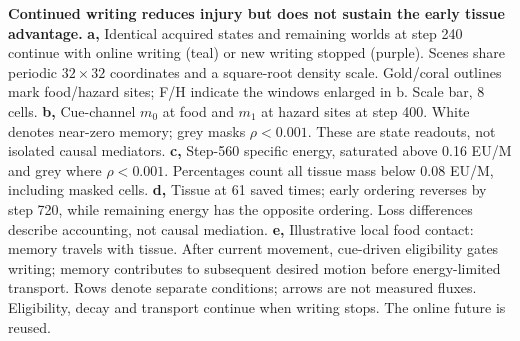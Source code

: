 \textbf{Continued writing reduces injury but does not sustain the early tissue advantage.}
\textbf{a,} Identical acquired states and remaining worlds at step 240 continue with online writing (teal) or new writing stopped (purple). Scenes share periodic $32\times32$ coordinates and a square-root density scale. Gold/coral outlines mark food/hazard sites; F/H indicate the windows enlarged in b. Scale bar, 8 cells.
\textbf{b,} Cue-channel $m_0$ at food and $m_1$ at hazard sites at step 400. White denotes near-zero memory; grey masks $\rho<0.001$. These are state readouts, not isolated causal mediators.
\textbf{c,} Step-560 specific energy, saturated above 0.16 EU/M and grey where $\rho<0.001$. Percentages count all tissue mass below 0.08 EU/M, including masked cells.
\textbf{d,} Tissue at 61 saved times; early ordering reverses by step 720, while remaining energy has the opposite ordering. Loss differences describe accounting, not causal mediation.
\textbf{e,} Illustrative local food contact: memory travels with tissue. After current movement, cue-driven eligibility gates writing; memory contributes to subsequent desired motion before energy-limited transport. Rows denote separate conditions; arrows are not measured fluxes. Eligibility, decay and transport continue when writing stops. The online future is reused.
